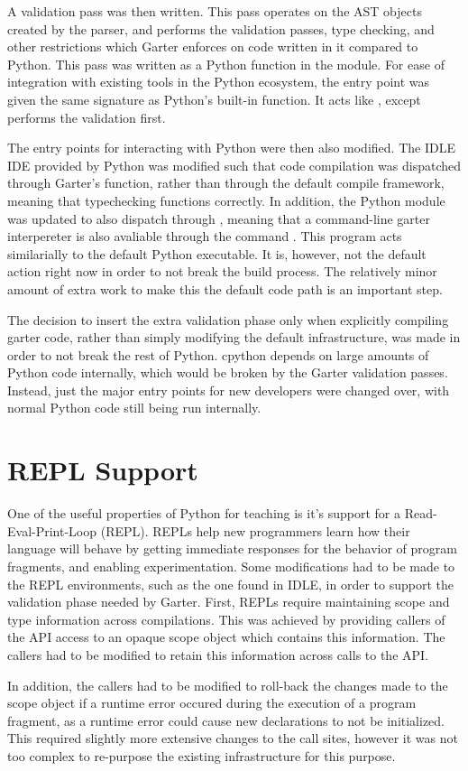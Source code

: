 A validation pass was then written. This pass operates on the AST objects
created by the parser, and performs the validation passes, type checking, and
other restrictions which Garter enforces on code written in it compared to
Python. This pass was written as a Python function in the  module.
For ease of integration with existing tools in the Python ecosystem, the entry
point was given the same signature as Python's built-in  function.
It acts like , except performs the validation first.

The entry points for interacting with Python were then also modified. The IDLE
IDE provided by Python was modified such that code compilation was dispatched
through Garter's  function, rather than through the default
compile framework, meaning that typechecking functions correctly. In addition,
the Python  module was updated to also dispatch through ,
meaning that a command-line garter interpereter is also avaliable through the
command . This program acts similarially to the default
Python executable. It is, however, not the default action right now in order to
not break the build process. The relatively minor amount of extra work to make
this the default code path is an important step.

The decision to insert the extra validation phase only when explicitly compiling
garter code, rather than simply modifying the default  infrastructure,
was made in order to not break the rest of Python. cpython depends on large amounts
of Python code internally, which would be broken by the Garter validation passes.
Instead, just the major entry points for new developers were changed over, with
normal Python code still being run internally.

\section{REPL Support}

One of the useful properties of Python for teaching is it's support for a
Read-Eval-Print-Loop (REPL). REPLs help new programmers learn how their language
will behave by getting immediate responses for the behavior of program
fragments, and enabling experimentation. Some modifications had to be made to
the REPL environments, such as the one found in IDLE, in order to support the
validation phase needed by Garter. First, REPLs require maintaining scope and
type information across compilations. This was achieved by providing callers of
the  API access to an opaque scope object which contains this
information. The callers had to be modified to retain this information across
calls to the  API.

In addition, the callers had to be modified to roll-back the changes made to the
scope object if a runtime error occured during the execution of a program
fragment, as a runtime error could cause new declarations to not be initialized.
This required slightly more extensive changes to the call sites, however it was
not too complex to re-purpose the existing infrastructure for this purpose.

